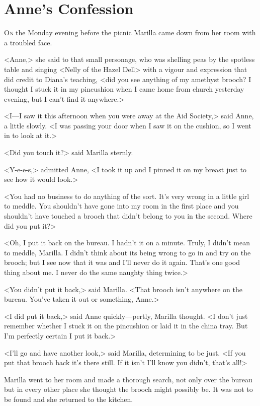 \chapter{Anne's Confession}

\lettrine[]{O}{n} the Monday evening before the picnic Marilla came down from her room with a troubled face.

\zz
<Anne,> she said to that small personage, who was shelling peas by the spotless table and singing <Nelly of the Hazel Dell> with a vigour and expression that did credit to Diana's teaching, <did you see anything of my amethyst brooch? I thought I stuck it in my pincushion when I came home from church yesterday evening, but I can't find it anywhere.>

<I—I saw it this afternoon when you were away at the Aid Society,> said Anne, a little slowly. <I was passing your door when I saw it on the cushion, so I went in to look at it.>

<Did you touch it?> said Marilla sternly.

<Y-e-e-s,> admitted Anne, <I took it up and I pinned it on my breast just to see how it would look.>

<You had no business to do anything of the sort. It's very wrong in a little girl to meddle. You shouldn't have gone into my room in the first place and you shouldn't have touched a brooch that didn't belong to you in the second. Where did you put it?>

<Oh, I put it back on the bureau. I hadn't it on a minute. Truly, I didn't mean to meddle, Marilla. I didn't think about its being wrong to go in and try on the brooch; but I see now that it was and I'll never do it again. That's one good thing about me. I never do the same naughty thing twice.>

<You didn't put it back,> said Marilla. <That brooch isn't anywhere on the bureau. You've taken it out or something, Anne.>

<I did put it back,> said Anne quickly—pertly, Marilla thought. <I don't just remember whether I stuck it on the pincushion or laid it in the china tray. But I'm perfectly certain I put it back.>

<I'll go and have another look,> said Marilla, determining to be just. <If you put that brooch back it's there still. If it isn't I'll know you didn't, that's all!>

Marilla went to her room and made a thorough search, not only over the bureau but in every other place she thought the brooch might possibly be. It was not to be found and she returned to the kitchen.

